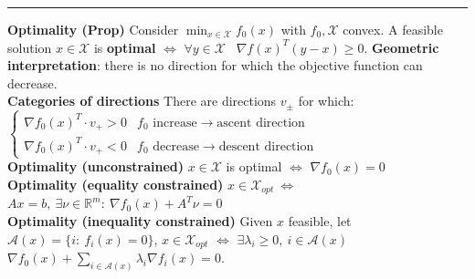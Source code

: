\documentclass[a4paper]{article}
\begin{document}
\vspace{-0.5cm}
\hrule
\noindent
\textbf{Optimality (Prop)} Consider $\min_{x\in\mathcal{X}}{f_0(x)}$ with $f_0,\mathcal{X}$ convex. A feasible solution $x\in\mathcal{X}$ is \textbf{optimal} $\iff$ $\forall{y}\in\mathcal{X}$ \ $\nabla{f(x)}^T(y-x)\ge0$. \textbf{Geometric interpretation}: there is no direction for which the objective function can decrease.\\
\textbf{Categories of directions} There are directions $v_\pm$ for which: $\begin{cases}
    \nabla{f_0(x)}^T\cdot{v_+}>0&\text{$f_0$ increase} \to \text{ascent direction}\\
    \nabla{f_0(x)}^T\cdot{v_+}<0&\text{$f_0$ decrease}\to\text{descent direction}
\end{cases}$\\
\textbf{Optimality (unconstrained)} $x\in\mathcal{X}$ is optimal $\iff$ $\nabla{f_0(x)}=0$\\
\textbf{Optimality (equality constrained)} $x\in\mathcal{X}_{opt} \ \iff$ $Ax=b, \ \exists \nu\in\mathbb{R}^m: \ 
\nabla{f_0(x)}+A^T\nu=0$\\
\textbf{Optimality (inequality constrained)} Given $x$ feasible, let $\mathcal{A}(x)=\{i: \ f_i(x)=0\}$, $x\in\mathcal{X}_{opt}$ $\iff$ $\exists\lambda_i\ge0, \ i\in\mathcal{A}(x)$ $\nabla{f_0(x)}+\sum_{i\in\mathcal{A}(x)}{\lambda_i\nabla{f_i(x)}}=0$.
\end{document}
